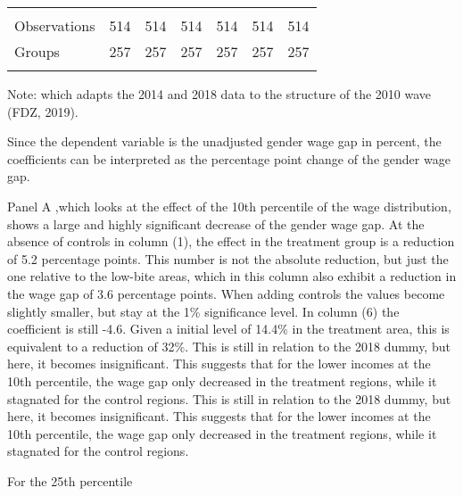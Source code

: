 \documentclass[12pt,draft,a4paper]{article}
\begin{document}
\begin{table}[htbp]
\begin{adjustbox}{width=\textwidth}
\begin{tabular}{l@{\hskip 10ex}llllll}
    & \\[-1.0em]
    \hline & \\[-1.0em]
    Observations              & 514       & 514       & 514       & 514       & 514       & 514       \\
    Groups                    & 257       & 257       & 257       & 257       & 257       & 257       \\
    \hline & \\[-1.0em]
    \end{tabular}
    \end{adjustbox}

    Note: which adapts the 2014 and 2018 data to the structure of the 2010 wave (FDZ, 2019).
    \label{tab:main}
    
    \end{table}

Since the dependent variable is the unadjusted gender wage gap in percent, the coefficients can be interpreted as  the percentage point change of the gender wage gap.

Panel A ,which looks at the effect of the 10th percentile of the wage distribution, shows a large and highly significant decrease of the gender wage gap. 
At the absence of controls in column (1), the effect in the treatment group is a reduction of 5.2 percentage points. This number is not the absolute reduction, but just the one relative to the low-bite areas, which in this column also exhibit a reduction in the wage gap of 3.6 percentage points.
When adding controls the values become slightly smaller, but stay at the 1\% significance level. In column (6) the coefficient is still -4.6. Given a initial level of 14.4\% in the treatment area, this is equivalent to a reduction of 32\%.
This is still in relation to the 2018 dummy, but here, it becomes insignificant. This suggests that for the lower incomes at the 10th percentile, the wage gap only decreased in the treatment regions, while it stagnated for the control regions.
This is still in relation to the 2018 dummy, but here, it becomes insignificant. This suggests that for the lower incomes at the 10th percentile, 
the wage gap only decreased in the treatment regions, while it stagnated for the control regions.

For the 25th percentile
\end{document}
